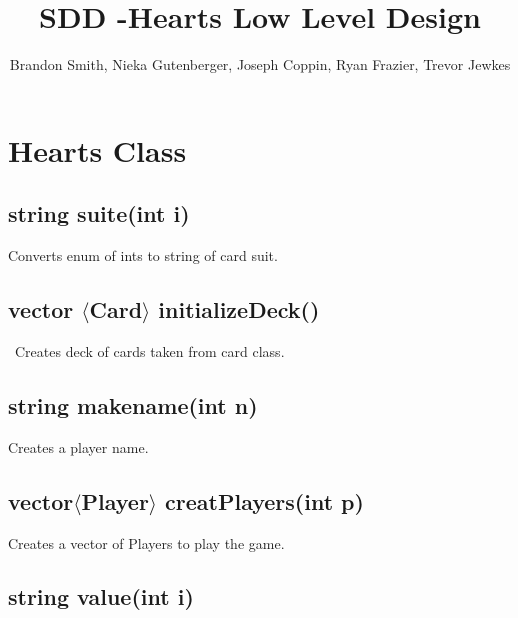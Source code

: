 \documentclass[]{scrartcl}
\title{SDD -Hearts Low Level Design}
\author{Brandon Smith, Nieka Gutenberger, Joseph Coppin, Ryan Frazier, Trevor Jewkes}
\begin{document}
\maketitle
\pagebreak
	
	\noindent{}


\section{Hearts Class}


\subsection{string suite(int i)}  
	Converts enum of ints to string of card suit.
\subsection{vector $\langle$Card$\rangle$ initializeDeck()} \
	Creates deck of cards taken from card class.
\subsection{string makename(int n) } 
	Creates a player name.
\subsection{vector$\langle$Player$\rangle$  creatPlayers(int p) } 
	Creates a vector of Players to play the game.
\subsection{string value(int i)}
\end{document}
